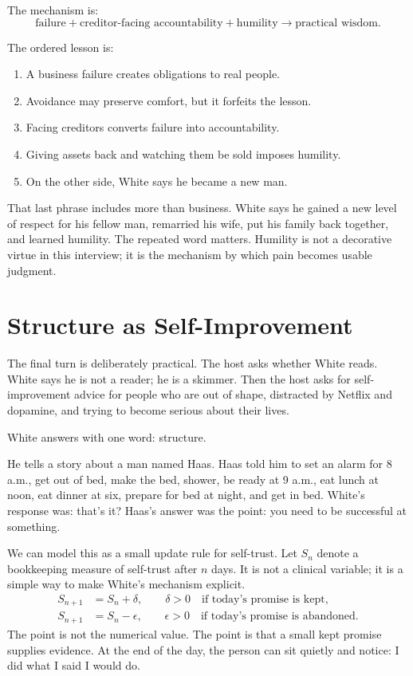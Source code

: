 The mechanism is:
\begin{equation}
\text{failure}
+
\text{creditor-facing accountability}
+
\text{humility}
\longrightarrow
\text{practical wisdom}.
\end{equation}

The ordered lesson is:
\begin{enumerate}
\item A business failure creates obligations to real people.
\item Avoidance may preserve comfort, but it forfeits the lesson.
\item Facing creditors converts failure into accountability.
\item Giving assets back and watching them be sold imposes humility.
\item On the other side, White says he became a new man.
\end{enumerate}

That last phrase includes more than business. White says he gained a new level of respect for his fellow man, remarried his wife, put his family back together, and learned humility. The repeated word matters. Humility is not a decorative virtue in this interview; it is the mechanism by which pain becomes usable judgment.

\section{Structure as Self-Improvement}

The final turn is deliberately practical. The host asks whether White reads. White says he is not a reader; he is a skimmer. Then the host asks for self-improvement advice for people who are out of shape, distracted by Netflix and dopamine, and trying to become serious about their lives.

White answers with one word: structure.

He tells a story about a man named Haas. Haas told him to set an alarm for 8 a.m., get out of bed, make the bed, shower, be ready at 9 a.m., eat lunch at noon, eat dinner at six, prepare for bed at night, and get in bed. White's response was: that's it? Haas's answer was the point: you need to be successful at something.

We can model this as a small update rule for self-trust. Let \(S_n\) denote a bookkeeping measure of self-trust after \(n\) days. It is not a clinical variable; it is a simple way to make White's mechanism explicit.
\begin{align}
S_{n+1} &= S_n + \delta,
\qquad \delta > 0
\quad \text{if today's promise is kept},\\
S_{n+1} &= S_n - \epsilon,
\qquad \epsilon > 0
\quad \text{if today's promise is abandoned}.
\end{align}
The point is not the numerical value. The point is that a small kept promise supplies evidence. At the end of the day, the person can sit quietly and notice: I did what I said I would do.

